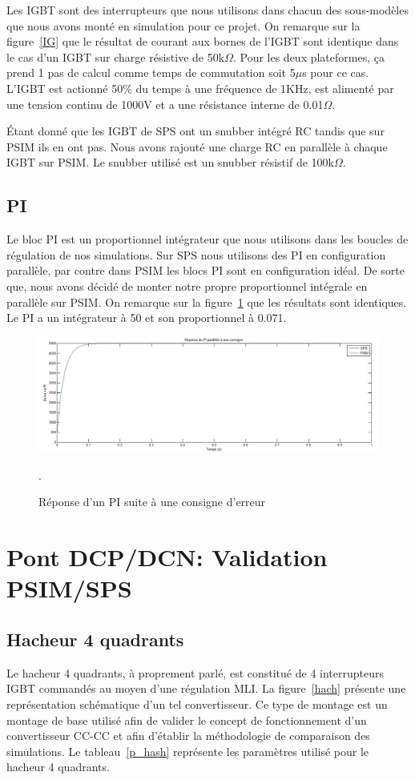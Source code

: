 \documentclass[11pt,letterpaper,final]{report}
\begin{document}
Les IGBT sont des interrupteurs que nous utilisons dans chacun des sous-modèles que nous avons monté en simulation pour ce projet. On remarque sur la figure~\ref{IG} que le résultat de courant aux bornes de l'IGBT sont identique dans le cas d'un IGBT sur charge résistive de 50k$\Omega$. Pour les deux plateformes, ça prend 1 pas de calcul comme temps de commutation soit 5$\mu$s pour ce cas. L'IGBT est actionné 50\% du temps à une fréquence de 1KHz, est alimenté par une tension continu de 1000V et a une résistance interne de 0.01$\Omega$. 

Étant donné que les IGBT de SPS ont un snubber intégré RC tandis que sur PSIM ils en ont pas. Nous avons rajouté une charge RC en parallèle à chaque IGBT sur PSIM. Le snubber utilisé est un snubber résistif de 100k$\Omega$.
 
\subsection{PI}
Le bloc PI est un proportionnel intégrateur que nous utilisons dans les boucles de régulation de nos simulations. Sur SPS nous utilisons des PI en configuration parallèle, par contre dans PSIM les blocs PI sont en configuration idéal. De sorte que, nous avons décidé de monter notre propre proportionnel intégrale en parallèle sur PSIM. On remarque sur la figure~\ref{PI} que les résultats sont identiques. Le PI a un intégrateur à 50 et son proportionnel à 0.071. 

\begin{figure}[htb]
\centering
\includegraphics[scale=0.5]{Fig/Comp/PI.jpg}
\caption{Réponse d'un PI suite à une consigne d'erreur}.
\label{PI}
\end{figure}

\clearpage
\section{Pont DCP/DCN: Validation PSIM/SPS}
\subsection{Hacheur 4 quadrants}
Le hacheur 4 quadrants, à proprement parlé, est constitué de 4 interrupteurs IGBT commandés au moyen d'une régulation MLI. La figure~\ref{hach} présente une représentation schématique d'un tel convertisseur. Ce type de montage est un montage de base utilisé afin de valider le concept de fonctionnement d'un convertisseur CC-CC et afin d'établir la méthodologie de comparaison des simulations. Le tableau~\ref{p_hash} représente les paramètres utilisé pour le hacheur 4 quadrants.
\end{document}
